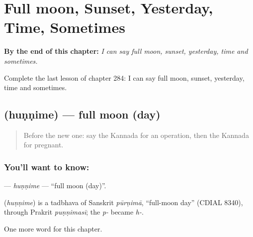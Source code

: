 
\chapter{Full moon, Sunset, Yesterday, Time, Sometimes}
\label{ch:ka-full-moon-sunset-yesterday-time-sometimes}

\begin{chapteropening}
\textbf{By the end of this chapter:} \emph{I can say full moon, sunset, yesterday, time and sometimes.}

Complete the last lesson of chapter 284: I can say full moon, sunset, yesterday, time and sometimes.
\end{chapteropening}

\section[\texorpdfstring{\kn{ಹುಣ್ಣಿಮೆ} (huṇṇime)}{ಹುಣ್ಣಿಮೆ (huṇṇime)}]{ (huṇṇime) — full moon (day)}

\label{lesson:KA-C284-hunnime}



\begin{quote}
Before the new one: say the Kannada for an operation, then the Kannada for pregnant.
\end{quote}

\subsection*{You'll want to know: }
\textbf{} — \emph{huṇṇime} — \textquotedblleft{}full moon (day)\textquotedblright{}.

\begin{cousinweb}
\textbf{} (\emph{huṇṇime}) is a tadbhava of Sanskrit \emph{pūrṇimā}, \textquotedblleft{}full-moon day\textquotedblright{} (CDIAL 8340), through Prakrit \emph{puṇṇimasī}; the \emph{p-} became \emph{h-}.
\end{cousinweb}

\begin{grammarlens}[title={What you've built}]
One more word for this chapter.
\end{grammarlens}

